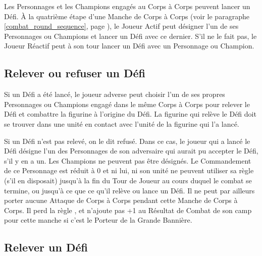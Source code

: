 Les Personnages et les Champions engagés au Corps à Corps peuvent lancer un Défi. À la quatrième étape d'une Manche de Corps à Corps (voir le paragraphe \ref{combat_round_sequence}, page \pageref{combat_round_sequence}), le Joueur Actif peut désigner l'un de ses Personnages ou Champions et lancer un Défi avec ce dernier. S'il ne le fait pas, le Joueur Réactif peut à son tour lancer un Défi avec un Personnage ou Champion.

\subsection{Relever ou refuser un Défi}

Si un Défi a été lancé, le joueur adverse peut choisir l'un de ses propres Personnages ou Champions engagé dans le même Corps à Corps pour relever le Défi et combattre la figurine à l'origine du Défi. La figurine qui relève le Défi doit se trouver dans une unité en contact avec l'unité de la figurine qui l'a lancé.

Si un Défi n'est pas relevé, on le dit refusé. Dans ce cas, le joueur qui a lancé le Défi désigne l'un des Personnages de son adversaire qui aurait pu accepter le Défi, s'il y en a un. Les Champions ne peuvent pas être désignés. Le Commandement de ce Personnage est réduit à 0 et ni lui, ni son unité ne peuvent utiliser sa règle \stubborn{} (s'il en disposait) jusqu'à la fin du Tour de Joueur au cours duquel le combat se termine, ou jusqu'à ce que ce qu'il relève ou lance un Défi. Il ne peut par ailleurs porter aucune Attaque de Corps à Corps pendant cette Manche de Corps à Corps. Il perd la règle \holdyourground{}, et n'ajoute pas +1 au Résultat de Combat de son camp pour cette manche si c'est le Porteur de la Grande Bannière.

\subsection{Relever un Défi}
\label{fighting_a_challenge}

